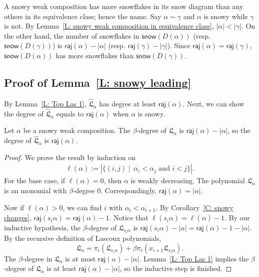 \documentclass[ALCO]{cedram}
\newcommand{\fL}{\mathfrak{L}}
\newcommand{\fLb}{\fL}
\newcommand{\topLas}{\widehat{\fL}}
\newcommand{\snow}{\mathsf{snow}}
\newcommand{\raj}{\mathsf{raj}}
\begin{document}
A snowy weak composition has more snowflakes in its snow diagram 
than any others in its equivalence class; hence the name.
Say $\alpha \sim \gamma$ and
$\alpha$ is snowy while $\gamma$ is not. 
By Lemma~\ref{L: snowy weak composition in equivalence class}, $|\alpha| <  |\gamma|$.
On the other hand, 
the number of snowflakes in $\snow(D(\alpha))$ 
(resp. $\snow(D(\gamma))$)
is $\raj(\alpha) - |\alpha|$ (resp. $\raj(\gamma) - |\gamma|$). 
Since $\raj(\alpha) = \raj(\gamma)$, $\snow(D(\alpha))$
has more snowflakes than $\snow(D(\gamma))$.

\subsection{Proof of Lemma~\ref{L: snowy leading}}
\label{SS: snowy}

By Lemma~\ref{L: Top Las 1},
$\topLas_\alpha$ has degree at least $\raj(\alpha)$.
Next, we can show the degree of $\topLas_\alpha$
equals to $\raj(\alpha)$ when $\alpha$ is snowy. 

\begin{lemma}
\label{L: Snowy degree}
Let $\alpha$ be a snowy weak composition.
The $\beta$-degree of $\fLb_\alpha$ 
is $\raj(\alpha) - |\alpha|$,
so the degree of $\topLas_\alpha$ is $\raj(\alpha)$.
\end{lemma}
\begin{proof}
We prove the result by induction on 
\begin{align*}
\ell(\alpha) := |\{(i,j) \mid\, \alpha_i < \alpha_j \text{ and } i < j\}|.
\end{align*}
For the base case, if $\ell(\alpha) = 0$,
then $\alpha$ is weakly decreasing.
The polynomial $\fLb_\alpha$ is an monomial with $\beta$-degree $0$.
Correspondingly, $\raj(\alpha) = |\alpha|$.

Now if $\ell(\alpha) > 0$,
we can find $i$ with $\alpha_i < \alpha_{i+1}$.
By Corollary~\ref{C: snowy changes},
$\raj(s_i \alpha) = \raj(\alpha) - 1$.
Notice that $\ell(s_i \alpha) = \ell(\alpha) - 1$.
By our inductive hypothesis, 
the $\beta$-degree of $\fLb_{s_i \alpha}$
is $\raj(s_i \alpha) - |\alpha| = \raj(\alpha) - 1 - |\alpha|$.
By the recursive definition of Lascoux polynomials,
$$
\fLb_\alpha 
= \pi_i(\fLb_{s_i\alpha}) + \beta \pi_i(x_{i+1}\fLb_{s_i\alpha}).
$$
The $\beta$-degree in $\fLb_\alpha$
is at most $\raj(\alpha) - |\alpha|$.
Lemma~\ref{L: Top Las 1} implies the 
$\beta$-degree of $\fLb_\alpha$ is at least 
$\raj(\alpha) - |\alpha|$,
so the inductive step is finished.
\end{proof}
\end{document}
